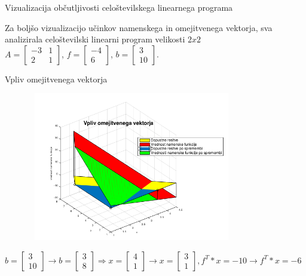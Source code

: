 \documentclass[t]{beamer}
\begin{document}
\begin{frame}{Vizualizacija občutljivosti celoštevilskega linearnega programa}
\begin{center}
Za boljšo vizualizacijo učinkov namenskega in omejitvenega vektorja, sva analizirala celoštevilski linearni program velikosti $2x2$
\\[0.5cm]
$ A = \begin{bmatrix}
  -3 & 1  \\
  2 & 1   
\end{bmatrix} $, $f=\begin{bmatrix} -4 \\ 6\end{bmatrix}$, $b=\begin{bmatrix} 3 \\ 10 \end{bmatrix}.$
\end{center}
\end{frame}

\begin{frame}{Vpliv omejitvenega vektorja}
\begin{center}
\begin{figure}[h]
\includegraphics[width=9.1cm,height=6.5cm]{viz1.png}
\end{figure}
$b=\begin{bmatrix} 3 \\ 10 \end{bmatrix} \to b=\begin{bmatrix} 3 \\ 8\end{bmatrix} \Rightarrow x=\begin{bmatrix} 4 \\ 1 \end{bmatrix} \to x=\begin{bmatrix} 3 \\ 1\end{bmatrix} , f^T*x=-10 \to f^T*x=-6$
\end{center}
\end{frame}
\end{document}
